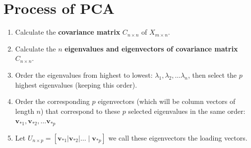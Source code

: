 \documentclass[11pt]{elegantbook}
\begin{document}
\section{Process of PCA}
\begin{enumerate}
    \item Calculate the \textbf{covariance matrix} $C_{n \times n}$ of $X_{m \times n}$.
    \item Calculate the $n$ \textbf{eigenvalues and eigenvectors of covariance matrix $C_{n \times n}$}.
    \item Order the eigenvalues from highest to lowest: $\lambda_1, \lambda_2, \ldots \lambda_n$, then select the $p$ highest eigenvalues (keeping this order).
    \item Order the corresponding $p$ eigenvectors (which will be column vectors of length $n$) that correspond to these $p$ selected eigenvalues in the same order: $\boldsymbol{v}_{* 1}, \boldsymbol{v}_{* 2}, \ldots \boldsymbol{v}_{* p}$
    \item Let $U_{n \times p}=\left[\boldsymbol{v}_{* 1}\left|\boldsymbol{v}_{* 2}\right| \ldots \mid \boldsymbol{v}_{* p}\right]$ we call these eigenvectors the loading vectors.
\end{enumerate}
\end{document}
